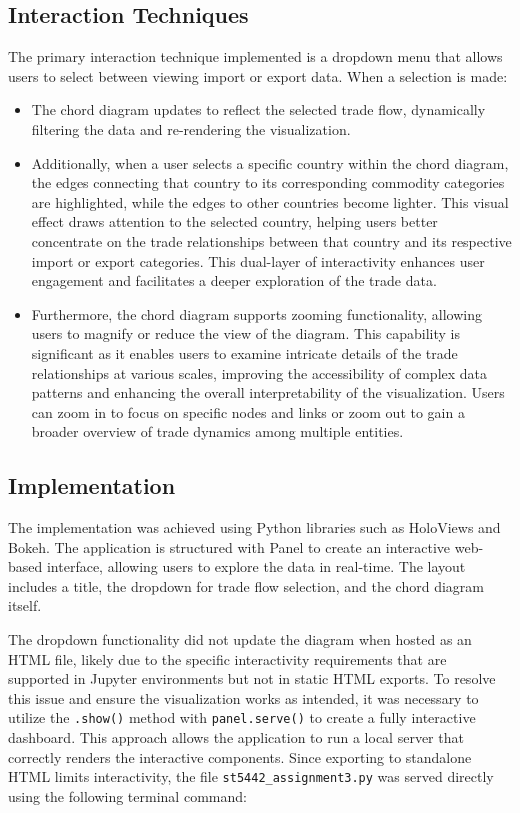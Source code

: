 \documentclass{article}
\begin{document}
\subsection{Interaction Techniques}
The primary interaction technique implemented is a dropdown menu that allows users to select between viewing import or export data. When a selection is made:
\begin{itemize}
    \item The chord diagram updates to reflect the selected trade flow, dynamically filtering the data and re-rendering the visualization.
    \item Additionally, when a user selects a specific country within the chord diagram, the edges connecting that country to its corresponding commodity categories are highlighted, while the edges to other countries become lighter. This visual effect draws attention to the selected country, helping users better concentrate on the trade relationships between that country and its respective import or export categories. This dual-layer of interactivity enhances user engagement and facilitates a deeper exploration of the trade data.
    \item Furthermore, the chord diagram supports zooming functionality, allowing users to magnify or reduce the view of the diagram. This capability is significant as it enables users to examine intricate details of the trade relationships at various scales, improving the accessibility of complex data patterns and enhancing the overall interpretability of the visualization. Users can zoom in to focus on specific nodes and links or zoom out to gain a broader overview of trade dynamics among multiple entities.
\end{itemize}

\subsection{Implementation}
The implementation was achieved using Python libraries such as HoloViews and Bokeh. The application is structured with Panel to create an interactive web-based interface, allowing users to explore the data in real-time. The layout includes a title, the dropdown for trade flow selection, and the chord diagram itself.

The dropdown functionality did not update the diagram when hosted as an HTML file, likely due to the specific interactivity requirements that are supported in Jupyter environments but not in static HTML exports. To resolve this issue and ensure the visualization works as intended, it was necessary to utilize the \texttt{.show()} method with \texttt{panel.serve()} to create a fully interactive dashboard. This approach allows the application to run a local server that correctly renders the interactive components. Since exporting to standalone HTML limits interactivity, the file \texttt{st5442\_assignment3.py} was served directly using the following terminal command:
\end{document}
